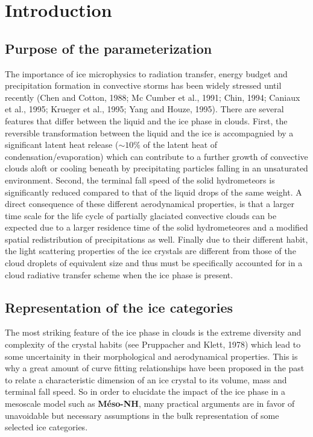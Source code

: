 \section{Introduction}
%
\subsection{Purpose of the parameterization}
%

The importance of ice microphysics to radiation transfer, energy budget and
precipitation formation in convective storms has been widely stressed until
recently (Chen and Cotton, 1988; Mc Cumber et al., 1991;  Chin, 1994; Caniaux
et al., 1995; Krueger et al., 1995; Yang and Houze, 1995). There are several
features that differ between the liquid and the ice phase in clouds. First, the
reversible transformation between the liquid and the ice is accompagnied by a
significant latent heat release ($\sim 10\%$ of the latent heat of
condensation/evaporation) which can contribute to a further growth of convective
clouds aloft or cooling beneath by precipitating particles falling in an
unsaturated environment. Second, the terminal fall speed of the solid
hydrometeors is significantly reduced compared to that of the liquid drops of
the same weight. A direct consequence of these different aerodynamical
properties, is that a larger time scale for the life cycle of partially
glaciated convective clouds can be expected due to a larger residence time
of the solid hydrometeores and a modified spatial redistribution of
precipitations as well. Finally due to their different habit,
the light scattering properties of the ice crystals are different from those of
the cloud droplets of equivalent size and thus must be specifically accounted
for in a cloud radiative transfer scheme when the ice phase is present.

%
\subsection{Representation of the ice categories}
%

The most striking feature of the ice phase in clouds is the extreme diversity
and complexity of the crystal habits (see Pruppacher and Klett, 1978) which
lead to some uncertainity in their morphological and aerodynamical properties.
This is why a great amount of curve fitting relationships have been proposed
in the past to relate a characteristic dimension of an ice crystal to its
volume, mass and terminal fall speed. So in order to elucidate the impact of
the ice phase in a mesoscale model such as {\bf M\'eso-NH}, many practical
arguments are in favor of unavoidable but necessary assumptions in the bulk
representation of some selected ice categories.

